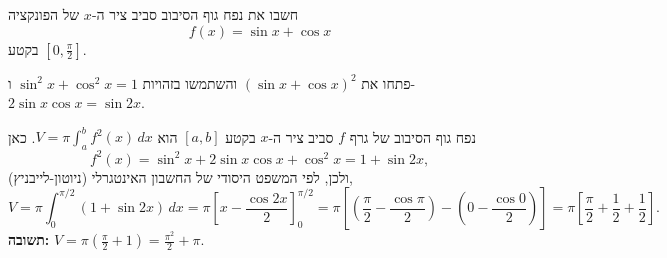 
\begin{question}
חשבו את נפח גוף הסיבוב סביב ציר ה-$x$ של הפונקציה
\[ f(x) = \sin x + \cos x \]
בקטע $[0, \frac{\pi}{2}]$.
\end{question}

\begin{hint}
פתחו את $(\sin x + \cos x)^2$ והשתמשו בזהויות $\sin^2 x + \cos^2 x = 1$ ו-$2\sin x\cos x = \sin 2x$.
\end{hint}

\begin{solution}
נפח גוף הסיבוב של גרף $f$ סביב ציר ה-$x$ בקטע $[a,b]$ הוא $V = \pi\int_a^b f^2(x)\,dx$. כאן
\[ f^2(x) = \sin^2 x + 2\sin x\cos x + \cos^2 x = 1 + \sin 2x, \]
ולכן, לפי המשפט היסודי של החשבון האינטגרלי (ניוטון-לייבניץ),
\[ V = \pi\int_0^{\pi/2} (1 + \sin 2x)\,dx = \pi\left[ x - \frac{\cos 2x}{2} \right]_0^{\pi/2}
     = \pi\left[ \left(\frac{\pi}{2} - \frac{\cos\pi}{2}\right) - \left(0 - \frac{\cos 0}{2}\right) \right]
     = \pi\left[ \frac{\pi}{2} + \frac12 + \frac12 \right]. \]
\textbf{תשובה:} $\boxed{V = \pi\left(\frac{\pi}{2} + 1\right) = \frac{\pi^2}{2} + \pi}$.
\end{solution}
